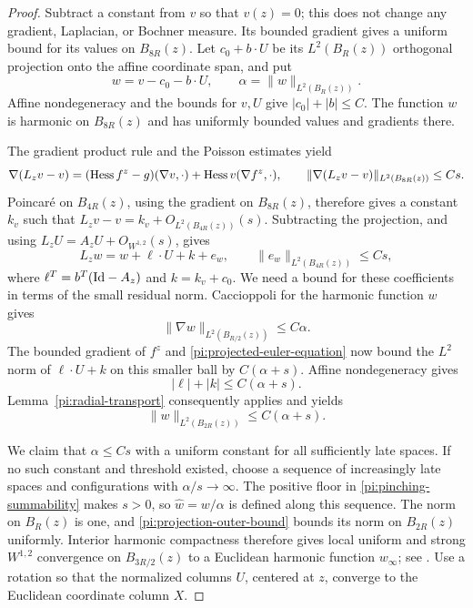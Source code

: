 \begin{proof}
Subtract a constant from $v$ so that $v(z)=0$; this does not
change any gradient, Laplacian, or Bochner measure.  Its bounded
gradient gives a uniform bound for its values on $B_{8R}(z)$.
Let $c_0+b\cdot U$ be its $L^2(B_R(z))$ orthogonal projection
onto the affine coordinate span, and put
\[
 w=v-c_0-b\cdot U,\qquad
 \alpha=\|w\|_{L^2(B_R(z))}.
\]
Affine nondegeneracy and the bounds for $v,U$ give
$|c_0|+|b|\le C$.  The function $w$ is harmonic on $B_{8R}(z)$
and has uniformly bounded values and gradients there.

The gradient product rule and the Poisson estimates yield
\begin{equation}
 \nabla(L_zv-v)
 =(\operatorname{Hess} f^z-g)(\nabla v,\cdot)
    +\operatorname{Hess} v(\nabla f^z,\cdot),
 \qquad
 \|\nabla(L_zv-v)\|_{L^2(B_{8R}(z))}\le Cs.
 \label{pi:euler-gradient}
\end{equation}
Poincar\'e on $B_{4R}(z)$, using the gradient on $B_{8R}(z)$,
therefore gives a constant $k_v$ such that
$L_zv-v=k_v+O_{L^2(B_{4R}(z))}(s)$.
Subtracting the projection, and using
$L_zU=A_zU+O_{W^{1,2}}(s)$, gives
\begin{equation}
 L_zw=w+\ell\cdot U+k+e_w,
 \qquad
 \|e_w\|_{L^2(B_{4R}(z))}\le Cs,
 \label{pi:projected-euler-equation}
\end{equation}
where $\ell^T=b^T(\mathrm{Id}-A_z)$ and $k=k_v+c_0$.
We need a bound for these coefficients in terms of the small
residual norm.  Caccioppoli for the harmonic function $w$ gives
\[
 \|\nabla w\|_{L^2(B_{R/2}(z))}\le C\alpha.
\]
The bounded gradient of $f^z$ and
\eqref{pi:projected-euler-equation} now bound the $L^2$ norm
of $\ell\cdot U+k$ on this smaller ball by $C(\alpha+s)$.
Affine nondegeneracy gives
\begin{equation}
 |\ell|+|k|\le C(\alpha+s).
 \label{pi:forcing-coefficient-bound}
\end{equation}
Lemma~\ref{pi:radial-transport} consequently applies and yields
\begin{equation}
 \|w\|_{L^2(B_{2R}(z))}\le C(\alpha+s).
 \label{pi:projection-outer-bound}
\end{equation}

We claim that $\alpha\le Cs$ with a uniform constant for all
sufficiently late spaces.  If no such constant and threshold
existed, choose a sequence of increasingly late spaces and
configurations with $\alpha/s\to\infty$.  The positive floor
in \eqref{pi:pinching-summability} makes $s>0$, so
$\widehat w=w/\alpha$ is defined along this sequence.
The norm on $B_R(z)$ is one, and
\eqref{pi:projection-outer-bound} bounds its norm on $B_{2R}(z)$
uniformly.  Interior harmonic compactness therefore gives local
uniform and strong $W^{1,2}$ convergence on $B_{3R/2}(z)$ to
a Euclidean harmonic function $w_\infty$; see \cite{AH18}.
Use a rotation so that the normalized columns $U$, centered at
$z$, converge to the Euclidean coordinate column $X$.


\end{proof}
